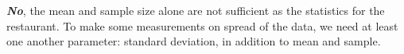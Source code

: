 \textit{\textbf{No}}, the mean and sample size alone are not sufficient as the statistics for the restaurant. To make some measurements on spread of the data, we need at least one another parameter: standard deviation, in addition to mean and sample.
